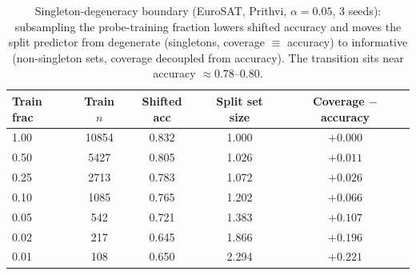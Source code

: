 \documentclass[journal]{IEEEtran}
\renewcommand{\_}{\textunderscore\allowbreak}
\begin{document}
\begin{table}[!t]\centering\small
\caption{Singleton-degeneracy boundary (EuroSAT, Prithvi, $\alpha{=}0.05$, 3 seeds): subsampling the
probe-training fraction lowers shifted accuracy and moves the split predictor from degenerate (singletons,
coverage $\equiv$ accuracy) to informative (non-singleton sets, coverage decoupled from accuracy). The
transition sits near accuracy $\approx0.78$--$0.80$.}\label{tab:singleton}
\begin{tabular}{lcccc}
\toprule
Train frac & Train $n$ & Shifted acc & Split set size & Coverage $-$ accuracy \\
\midrule
1.00 & 10854 & 0.832 & 1.000 & $+0.000$ \\
0.50 & 5427  & 0.805 & 1.026 & $+0.011$ \\
0.25 & 2713  & 0.783 & 1.072 & $+0.026$ \\
0.10 & 1085  & 0.765 & 1.202 & $+0.066$ \\
0.05 & 542   & 0.721 & 1.383 & $+0.107$ \\
0.02 & 217   & 0.645 & 1.866 & $+0.196$ \\
0.01 & 108   & 0.650 & 2.294 & $+0.221$ \\
\bottomrule
\end{tabular}
\end{table}
\end{document}
